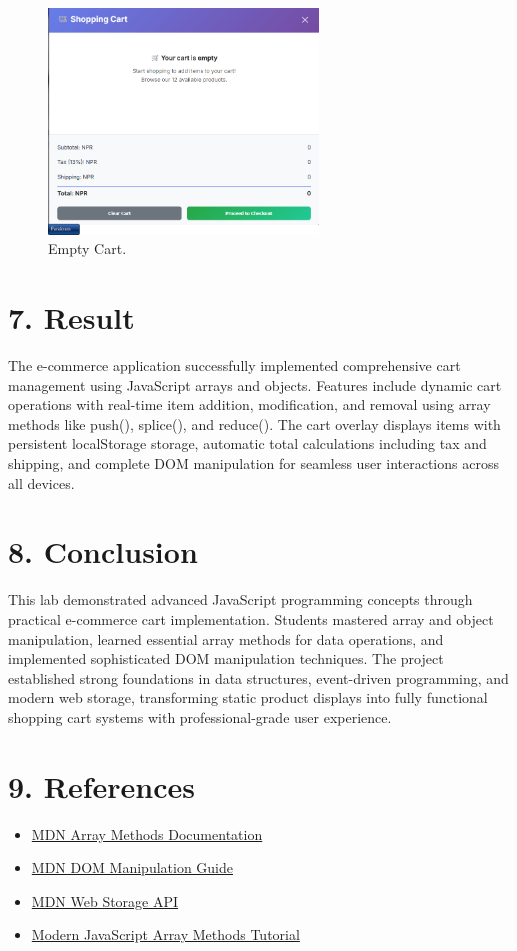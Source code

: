 \documentclass[a4paper,12pt]{article}
\begin{document}
\begin{figure}[H]
  \centering
  \includegraphics[width=\textwidth,height=6cm,keepaspectratio]{images/output7.png}
  \caption{Empty Cart.}
  \label{fig:img7}
\end{figure}

\section*{7. Result}
The e-commerce application successfully implemented comprehensive cart management using JavaScript arrays and objects. Features include dynamic cart operations with real-time item addition, modification, and removal using array methods like push(), splice(), and reduce(). The cart overlay displays items with persistent localStorage storage, automatic total calculations including tax and shipping, and complete DOM manipulation for seamless user interactions across all devices.

\section*{8. Conclusion}
This lab demonstrated advanced JavaScript programming concepts through practical e-commerce cart implementation. Students mastered array and object manipulation, learned essential array methods for data operations, and implemented sophisticated DOM manipulation techniques. The project established strong foundations in data structures, event-driven programming, and modern web storage, transforming static product displays into fully functional shopping cart systems with professional-grade user experience.

\section*{9. References}
\begin{itemize}
  \item \href{https://developer.mozilla.org/en-US/docs/Web/JavaScript/Reference/Global_Objects/Array}{MDN Array Methods Documentation}
  \item \href{https://developer.mozilla.org/en-US/docs/Web/API/Document_Object_Model}{MDN DOM Manipulation Guide}
  \item \href{https://developer.mozilla.org/en-US/docs/Web/API/Storage}{MDN Web Storage API}
  \item \href{https://javascript.info/array-methods}{Modern JavaScript Array Methods Tutorial}
\end{itemize}
\end{document}
